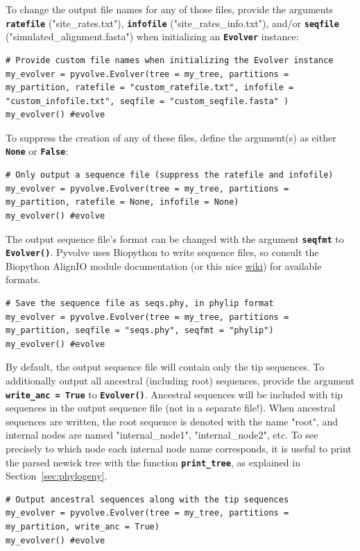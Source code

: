 \documentclass{article}
\newcommand{\code}[1]{\textbf{\texttt{\small{#1}}}}
\begin{document}
To change the output file names for any of those files, provide the arguments \code{ratefile} ("site\_rates.txt"), \code{infofile} ("site\_rates\_info.txt"), and/or \code{seqfile} ("simulated\_alignment.fasta") when initializing an \code{Evolver} instance:
\begin{lstlisting}
# Provide custom file names when initializing the Evolver instance
my_evolver = pyvolve.Evolver(tree = my_tree, partitions = my_partition, ratefile = "custom_ratefile.txt", infofile = "custom_infofile.txt", seqfile = "custom_seqfile.fasta" )
my_evolver() #evolve
\end{lstlisting}

To suppress the creation of any of these files, define the argument(s) as either \code{None} or \code{False}:
\begin{lstlisting}
# Only output a sequence file (suppress the ratefile and infofile)
my_evolver = pyvolve.Evolver(tree = my_tree, partitions = my_partition, ratefile = None, infofile = None)
my_evolver() #evolve
\end{lstlisting}

The output sequence file's format can be changed with the argument \code{seqfmt} to \code{Evolver()}. Pyvolve uses Biopython to write sequence files, so consult the Biopython AlignIO module documentation (or this nice \href{http://biopython.org/wiki/AlignIO}{wiki}) for available formats.
\begin{lstlisting}
# Save the sequence file as seqs.phy, in phylip format 
my_evolver = pyvolve.Evolver(tree = my_tree, partitions = my_partition, seqfile = "seqs.phy", seqfmt = "phylip")
my_evolver() #evolve
\end{lstlisting}

By default, the output sequence file will contain only the tip sequences. To additionally output all ancestral (including root) sequences, provide the argument \code{write\_anc = True} to \code{Evolver()}. Ancestral sequences will be included with tip sequences in the output sequence file (not in a separate file!). When ancestral sequences are written, the root sequence is denoted with the name "root", and internal nodes are named "internal\_node1", "internal\_node2", etc. To see precisely to which node each internal node name corresponds, it is useful to print the parsed newick tree with the function \code{print\_tree}, as explained in Section~\ref{sec:phylogeny}.
\begin{lstlisting}
# Output ancestral sequences along with the tip sequences
my_evolver = pyvolve.Evolver(tree = my_tree, partitions = my_partition, write_anc = True)
my_evolver() #evolve
\end{lstlisting}
\end{document}
